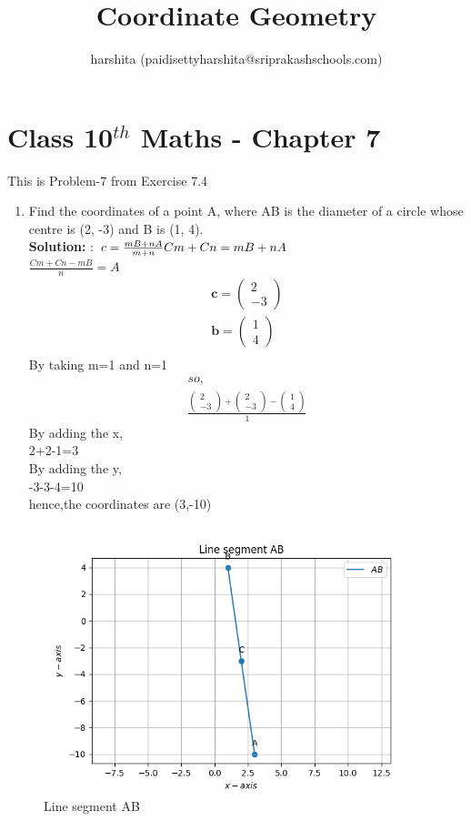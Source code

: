 \documentclass[10pt]{article}
\title{Coordinate Geometry}
\author{harshita (paidisettyharshita@sriprakashschools.com)}
\newcommand{\myvec}[1]{\ensuremath{\begin{pmatrix}#1\end{pmatrix}}}
\newcommand{\solution}{\noindent \textbf{Solution: }}
\let\vec\mathbf
\begin{document}
\maketitle
\section*{Class 10$^{th}$ Maths - Chapter 7}
This is Problem-7 from Exercise 7.4
\begin{enumerate}
\item Find the coordinates of a point A, where AB is the diameter of a circle whose centre is (2, -3) and B is (1, 4).\\

\solution:
$c = \frac{mB+nA}{m+n}\\
Cm+Cn=mB+nA$\\
$\frac{Cm+Cn-mB}{n}=A$\\
\begin{align}
\vec{c} = \myvec{2\\-3}\\
\vec{b} = \myvec{1\\4} \\
\end{align}
By taking m=1 and n=1
\begin{align}
so,\\
\frac{\myvec{2\\-3}+\myvec{2\\-3}-\myvec{1\\4}}{1}
\end{align}
By adding the x,\\
2+2-1=3\\
By adding the y,\\
-3-3-4=10\\
hence,the coordinates are (3,-10)

\end{enumerate}
\begin{figure}[H]
			\centering
			\includegraphics[width=\columnwidth]{figs/Figure_1.png}
			\caption{Line segment AB}
			\label{fig:5}
		\end{figure}
\end{document}
